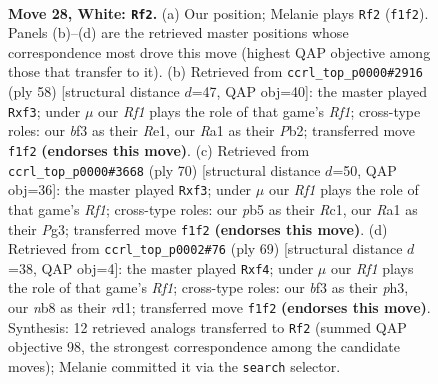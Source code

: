 \documentclass[11pt]{article}
\begin{document}
\clearpage

\begin{figure}[p]\centering
\begin{subfigure}{0.46\textwidth}\centering
\resizebox{\linewidth}{!}{%
\newchessgame
\chessboard[
  setfen={1n2k3/8/8/ppb2p2/8/5b2/Pr6/R4RK1 w - - 0 28},
  showmover=false,
  pgfstyle=straightmove, color=movearrow, markmove={f1-f2}
]}
\caption{}
\end{subfigure}\hfill
\begin{subfigure}{0.46\textwidth}\centering
\resizebox{\linewidth}{!}{%
\newchessgame
\chessboard[
  setfen={r7/p5bk/8/2N3B1/P5b1/5n2/1P6/4RRK1 w - - 1 30},
  showmover=false,
  pgfstyle=straightmove, color=movearrow, markmove={f1-f3}
]}
\caption{}
\end{subfigure}
\\[4pt]
\begin{subfigure}{0.46\textwidth}\centering
\resizebox{\linewidth}{!}{%
\newchessgame
\chessboard[
  setfen={2r3k1/P5pp/4p3/6r1/8/3N1bP1/8/2R2R1K w - - 0 36},
  showmover=false,
  pgfstyle=straightmove, color=movearrow, markmove={f1-f3}
]}
\caption{}
\end{subfigure}\hfill
\begin{subfigure}{0.46\textwidth}\centering
\resizebox{\linewidth}{!}{%
\newchessgame
\chessboard[
  setfen={1r3rk1/6p1/4R3/7p/5B2/7P/5PP1/3R2K1 b - - 0 35},
  showmover=false,
  pgfstyle=straightmove, color=movearrow, markmove={f8-f4}
]}
\caption{}
\end{subfigure}
\caption{\textbf{Move 28, White: \texttt{Rf2}.} (a) Our position; Melanie plays \texttt{Rf2} (\texttt{f1f2}). Panels (b)--(d) are the retrieved master positions whose correspondence most drove this move (highest QAP objective among those that transfer to it). (b) Retrieved from \texttt{ccrl\_top\_p0000\#2916} (ply 58) [structural distance $d$=47, QAP obj=40]: the master played \texttt{Rxf3}; under $\mu$ our \emph{Rf1} plays the role of that game's \emph{Rf1}; cross-type roles: our \emph{b}f3 as their \emph{R}e1, our \emph{R}a1 as their \emph{P}b2; transferred move \texttt{f1f2} \textbf{(endorses this move)}. (c) Retrieved from \texttt{ccrl\_top\_p0000\#3668} (ply 70) [structural distance $d$=50, QAP obj=36]: the master played \texttt{Rxf3}; under $\mu$ our \emph{Rf1} plays the role of that game's \emph{Rf1}; cross-type roles: our \emph{p}b5 as their \emph{R}c1, our \emph{R}a1 as their \emph{P}g3; transferred move \texttt{f1f2} \textbf{(endorses this move)}. (d) Retrieved from \texttt{ccrl\_top\_p0002\#76} (ply 69) [structural distance $d$=38, QAP obj=4]: the master played \texttt{Rxf4}; under $\mu$ our \emph{Rf1} plays the role of that game's \emph{Rf1}; cross-type roles: our \emph{b}f3 as their \emph{p}h3, our \emph{n}b8 as their \emph{r}d1; transferred move \texttt{f1f2} \textbf{(endorses this move)}. Synthesis: 12 retrieved analogs transferred to \texttt{Rf2} (summed QAP objective 98, the strongest correspondence among the candidate moves); Melanie committed it via the \texttt{search} selector.}
\label{fig:thought-m54}
\end{figure}
\end{document}
